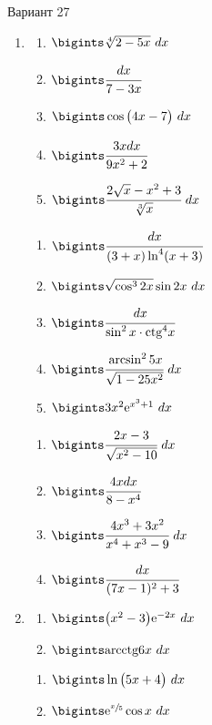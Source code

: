 \documentclass{article}
\begin{document}
\begin{multicols}{2}
	\centerline{Вариант 27}
	\begin{enumerate}[label=\Roman*.]
		\item
		\begin{multicols}{3}
			\begin{enumerate}[label=\arabic*.]
				\setlength\itemsep{1em}
				\item $\bigints\sqrt[4]{2-5x}\ dx$
				\item $\bigints\cfrac{dx}{7-3x}$
				\item $\bigints\cos \big( 4x-7 \big)\ dx$
				\item $\bigints\cfrac{3xdx}{9x^2+2}$
				\item $\bigints\cfrac{2\sqrt{x} - x^2+3}{\sqrt[3]{x}}\ dx$
			\end{enumerate}
			\vfill\null\columnbreak
			\begin{enumerate}[label=\arabic*. , start=6]
				\setlength\itemsep{1em}
				\item $\bigints\cfrac{dx}{(3 + x)\ln^4(x+3)}$
				\item $\bigints\sqrt{\cos^32x}\sin 2x\ dx$
				\item $\bigints\cfrac{dx}{\sin^2x \cdot \mbox{ctg}^4x}$
				\item $\bigints\cfrac{\arcsin^2 5x}{\sqrt{1-25 x^2}}\ dx$
				\item $\bigints 3x^2\mbox{e}^{x^3 + 1}\ dx$
			\end{enumerate}
			\vfill\null\columnbreak
			\begin{enumerate}[label=\arabic*. , start=11]
				\setlength\itemsep{1em}
				\item $\bigints\cfrac{2x - 3}{\sqrt{x^2 - 10}}\ dx$
				\item $\bigints\cfrac{4xdx}{8-x^4}$
				\item $\bigints\cfrac{4x^3 + 3x^2}{x^4 + x^3 - 9}\ dx$
				\item $\bigints\cfrac{dx}{(7x - 1)^2 + 3}$
			\end{enumerate}
			\vfill\null\columnbreak
		\end{multicols}
		
		\item
		\begin{multicols}{3}
			\begin{enumerate}[label=\arabic*.]
				\setlength\itemsep{1em}
				\item $\bigints\big(x^2 - 3\big)\mbox{e}^{-2x}\ dx$
				\item $\bigints\mbox{arcctg}6x\ dx$
			\end{enumerate}
			\vfill\null\columnbreak
			\begin{enumerate}[label=\arabic*., start=3]
				\setlength\itemsep{1em}
				\item $\bigints\ln\big(5x + 4\big)\ dx$
				\item $\bigints\mbox{e}^{\sfrac{x}{5}}\cos x\ dx$
			\end{enumerate}
			\vfill\null\columnbreak
			\vfill\null\columnbreak
		\end{multicols}
		

\end{enumerate}
\end{multicols}
\end{document}

